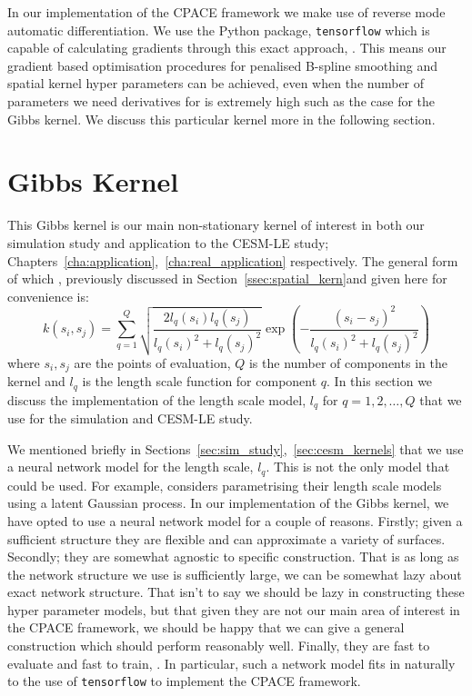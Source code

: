 In our implementation of the CPACE framework we make use of reverse mode automatic differentiation.
We use the Python package, \verb*|tensorflow| which is capable of calculating gradients through this exact approach, \citep{abadi_tensorflow_2016}. 
This means our gradient based optimisation procedures for penalised B-spline smoothing and spatial kernel hyper parameters can be achieved, even when the number of parameters we need derivatives for is extremely high such as the case for the Gibbs kernel.
We discuss this particular kernel more in the following section.


\section{Gibbs Kernel \label{sec:gibbs_kernel}}
This Gibbs kernel is our main non-stationary kernel of interest in both our simulation study and application to the CESM-LE study; Chapters~\ref{cha:application},~\ref{cha:real_application} respectively.
The general form of which , previously discussed in Section~\ref{ssec:spatial_kern}and given here for convenience is: 
\begin{equation}
	k\left(s_{i}, s_{j}\right) = \sum_{q=1}^{Q} \sqrt{\frac{2l_q(s_i)l_q(s_j)}{l_q(s_i)^2 + l_q(s_j)^2}} \exp \left(-\frac{\left(s_i - s_j\right)^2}{l_q(s_i)^2 + l_q(s_j)^2}\right)
\end{equation}
where $s_i, s_j$ are the points of evaluation, $Q$ is the number of components in the kernel and $l_q$ is the length scale  function for component $q$.
In this section we discuss the implementation of the length scale model, $l_q$ for $q=1,2,\dots,Q$ that we use for the simulation and CESM-LE study.

We mentioned briefly in Sections~\ref{sec:sim_study},~\ref{sec:cesm_kernels} that we use a neural network model for the length scale, $l_q$.
This is not the only model that could be used.
For example, \citep{paciorek_spatial_2006} considers parametrising their length scale models using a latent Gaussian process.
In our implementation of the Gibbs kernel, we have opted to use a neural network model for a couple of reasons.
Firstly; given a sufficient structure they are flexible and can approximate a variety of surfaces.
Secondly; they are somewhat agnostic to specific construction.
That is as long as the network structure we use is sufficiently large, we can be somewhat lazy about exact network structure. 
That isn't to say we should be lazy in constructing these hyper parameter models, but that given they are not our main area of interest in the CPACE framework, we should be happy that we can give a general construction which should perform reasonably well.
Finally, they are fast to evaluate and fast to train, \citep{abadi_tensorflow_2016}.
In particular, such a network model fits in naturally to the use of \verb*|tensorflow| to implement the CPACE framework.

